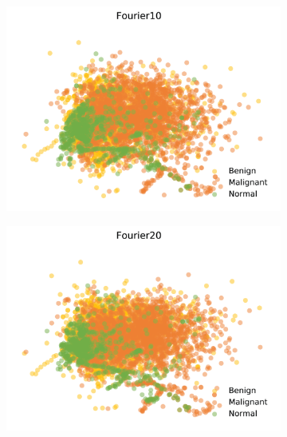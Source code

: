 \begin{figure}[H]
    \centering
    \begin{subfigure}{.45\textwidth}
      \includegraphics[width=\textwidth]{contents/chapter_4/resources/visualisation_frequency_Fourier10.png}
    \end{subfigure}
    \begin{subfigure}{.45\textwidth}
      \includegraphics[width=\textwidth]{contents/chapter_4/resources/visualisation_frequency_Fourier20.png}
    \end{subfigure}
    

\end{figure}
